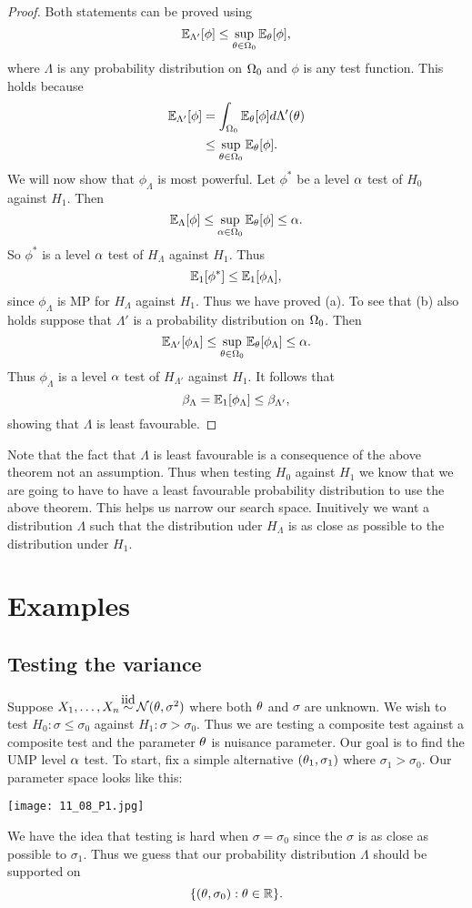 \begin{proof}
    Both statements can be proved using 
    \[{\mathbb{E}}_{\Lambda'}[\phi] \le \sup_{{\theta} \in {{\Omega}}_0}{\mathbb{E}}_{\theta}[\phi], \]
    where $\Lambda$ is any probability distribution on ${{\Omega}}_0$ and $\phi$ is any test function. This holds because
    \begin{align*}
        {\mathbb{E}}_{\Lambda'}[\phi] &=\int_{{{\Omega}}_0} {\mathbb{E}}_{\theta}[\phi]d\Lambda'({\theta})\\
        &\le  \sup_{{\theta} \in {{\Omega}}_0}{\mathbb{E}}_{\theta}[\phi].
    \end{align*}
    We will now show that $\phi_\Lambda$ is most powerful. Let $\phi^*$ be a level ${\alpha}$ test of $H_0$ against $H_1$. Then 
    \[{\mathbb{E}}_{\Lambda}[\phi] \le \sup_{{\alpha} \in {{\Omega}}_0}{\mathbb{E}}_{\theta}[\phi] \le {\alpha}. \]
    So $\phi^*$ is a level ${\alpha}$ test of $H_\Lambda$ against $H_1$. Thus 
    \[{\mathbb{E}}_1[\phi^*] \le {\mathbb{E}}_1[\phi_\Lambda], \]
    since $\phi_\Lambda$ is MP for $H_\Lambda$ against $H_1$. Thus we have proved (a). To see that (b) also holds suppose that $\Lambda'$ is a probability distribution on ${{\Omega}}_0$. Then 
    \[{\mathbb{E}}_{\Lambda'}[\phi_{\Lambda}] \le \sup_{{\theta} \in {{\Omega}}_0} {\mathbb{E}}_{\theta}[\phi_\Lambda] \le {\alpha}.\]
    Thus $\phi_\Lambda$ is a level ${\alpha}$ test of $H_{\Lambda'}$ against $H_1$. It follows that 
    \[\beta_{\Lambda} = {\mathbb{E}}_1[\phi_\Lambda] \le \beta_{\Lambda'}, \]
    showing that $\Lambda$ is least favourable.
\end{proof}
\begin{remark}
    Note that the fact that $\Lambda$ is least favourable is a consequence of the above theorem not an assumption. Thus when testing $H_0$ against $H_1$ we know that we are going to have to have a least favourable probability distribution to use the above theorem. This helps us narrow our search space. Inuitively we want a distribution $\Lambda$ such that the distribution uder $H_\Lambda$ is as close as possible to the distribution under $H_1$.
\end{remark}
\section{Examples}
\subsection{Testing the variance}
Suppose $X_1,\ldots, X_n \iid \Na(\ta,\sigma^2)$ where both ${\theta}$ and $\sigma$ are unknown. We wish to test $H_0 : \sigma \le \sigma_0$ against $H_1 : \sigma> \sigma_0$. Thus we are testing a composite test against a composite test and the parameter ${\theta}$ is nuisance parameter. Our goal is to find the UMP level ${\alpha}$ test. To start, fix a simple alternative $({\theta}_1,\sigma_1)$ where $\sigma_1 > \sigma_0$. Our parameter space looks like this:
\begin{center}
    \texttt{[image: 11\_08\_P1.jpg]}
\end{center}
We have the idea that testing is hard when $\sigma = \sigma_0$ since the $\sigma$ is as close as possible to $\sigma_1$. Thus we guess that our probability distribution $\Lambda$ should be supported on 
\[\{({\theta},\sigma_0):{\theta} \in {\mathbb R}\}.\] 

